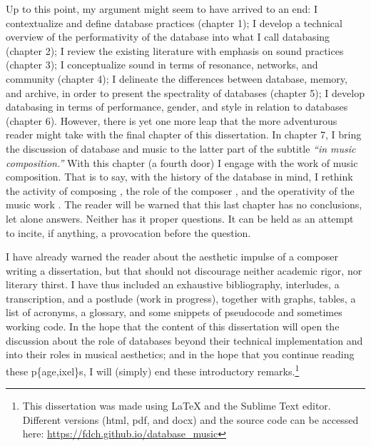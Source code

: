 Up to this point, my argument might seem to have arrived to an end: I contextualize and define database practices (chapter 1); I develop a technical overview of the performativity of the database into what I call databasing (chapter 2); I review the existing literature with emphasis on sound practices (chapter 3); I conceptualize sound in terms of resonance, networks, and community (chapter 4); I delineate the differences between database, memory, and archive, in order to present the spectrality of databases (chapter 5); I develop databasing in terms of performance, gender, and style in relation to databases (chapter 6). However, there is yet one more leap that the more adventurous reader might take with the final chapter of this dissertation. In chapter 7, I bring the discussion of database and music to the latter part of the subtitle \textit{``in music composition.''} With this chapter (a fourth door) I engage with the work of music composition. That is to say, with the history of the database in mind, I rethink the activity of composing \parencite{Vag01:Som}, the role of the composer \parencite{Lew99:Int}, and the operativity of the music work \parencite{Cas00:The}. The reader will be warned that this last chapter has no conclusions, let alone answers. Neither has it proper questions. It can be held as an attempt to incite, if anything, a provocation before the question.

I have already warned the reader about the aesthetic impulse of a composer writing a dissertation, but that should not discourage neither academic rigor, nor literary thirst. I have thus included an exhaustive bibliography, interludes, a transcription, and a postlude (work in progress), together with graphs, tables, a list of acronyms, a glossary, and some snippets of pseudocode and sometimes working code. In the hope that the content of this dissertation will open the discussion about the role of databases beyond their technical implementation and into their roles in musical aesthetics; and in the hope that you continue reading these p\{age,ixel\}s, I will (simply)  end  these introductory remarks.\footnote{This dissertation was made using \LaTeX{} and the Sublime Text editor. Different versions (html, pdf, and docx) and the source code can be accessed here: \url{https://fdch.github.io/database_music}}
